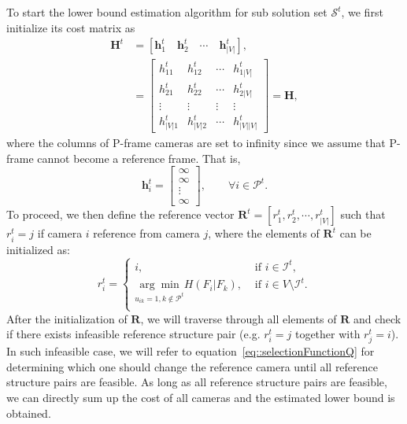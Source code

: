 To start the lower bound estimation algorithm for sub solution set $\mathcal{S}^t$, we first initialize its cost matrix as
\begin{align}
\mathbf{H}^t
&= \left[ \mathbf{h}_1^t \quad \mathbf{h}_2^t \quad \cdots \quad \mathbf{h}_{|V|}^t \right], \nonumber \\
&= \left[ \begin{array}{cccc}
h_{11}^t &h_{12}^t &\cdots &h_{1|V|}^t \\
h_{21}^t &h_{22}^t &\cdots &h_{2|V|}^t \\
\vdots &\vdots &\vdots &\vdots \\
h_{|V|1}^t &h_{|V|2}^t &\cdots &h_{|V||V|}^t
\end{array} \right]
= \mathbf{H},
\label{eq::modBBcostMatrix}
\end{align}
where the columns of P-frame cameras are set to infinity since we assume that P-frame cannot become a reference frame.
That is,
\begin{equation}
\mathbf{h}^t_i = \left[ \begin{array}{c}
\infty \\
\infty \\
\vdots \\
\infty
\end{array} \right],
\quad \quad \forall i \in \mathcal{P}^t.
\label{eq::infColumn}
\end{equation}
To proceed, we then define the reference vector ${\mathbf{R}^t = [r_1^t,r_2^t,\cdots,r_{|V|}^t]}$ such that $r_i^t = j$ if camera $i$ reference from camera $j$, where the elements of $\mathbf{R}^t$ can be initialized as:
\begin{equation}
r_i^t = 
\left\{ \begin{array}{cc}
i,  &\text{ if $i \in \mathcal{I}^t$,} \\                  	   
\underset{u_{ik}=1, k \notin \mathcal{P}^t}{\arg\min} H(F_i|F_k),  &\text{ if $i \in V\setminus \mathcal{I}^t$.} \\
\end{array} \right.
\label{eq::initRefStructure}
\end{equation}
After the initialization of $\mathbf{R}$, we will traverse through all elements of $\mathbf{R}$ and check if there exists infeasible reference structure pair (e.g. $r_i^t = j$ together with $r_j^t=i$).
In such infeasible case, we will refer to equation~\eqref{eq::selectionFunctionQ} for determining which one should change the reference camera until all reference structure pairs are feasible.
As long as all reference structure pairs are feasible, we can directly sum up the cost of all cameras and the estimated lower bound is obtained.
